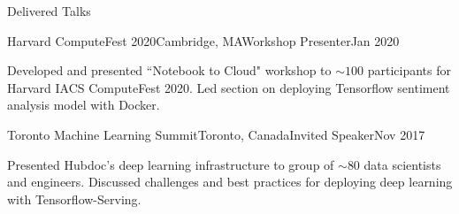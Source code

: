 \documentclass{resume} %
\begin{document}
\begin{rSection}{Delivered Talks}

\begin{rSubsection}{Harvard ComputeFest 2020}{Cambridge, MA}{Workshop Presenter}{Jan 2020}

  \item Developed and presented ``Notebook to Cloud" workshop to ${\sim} 100$ participants for Harvard IACS ComputeFest 2020. Led section on deploying Tensorflow sentiment analysis model with Docker.

\end{rSubsection}

\begin{rSubsection}{Toronto Machine Learning Summit}{Toronto, Canada}{Invited Speaker}{Nov 2017}

  \item Presented Hubdoc's deep learning infrastructure to group of ${\sim} 80$ data scientists and engineers. Discussed challenges and best practices for deploying deep learning with Tensorflow-Serving.

\end{rSubsection}




\end{rSection}
\end{document}
